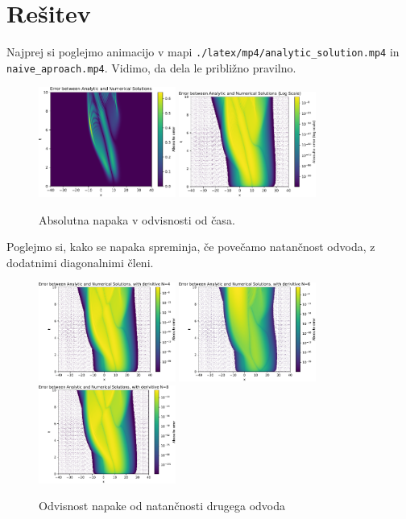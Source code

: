 \section{Rešitev}

Najprej si poglejmo animacijo v mapi \verb|./latex/mp4/analytic_solution.mp4| in \verb|naive_aproach.mp4|.
Vidimo, da dela le približno pravilno.

\begin{figure}[h]
    \centering
    \includegraphics[width=0.4\textwidth]{pdf/abs_error.pdf}
    \includegraphics[width=0.4\textwidth]{pdf/abs_error_log.pdf}
    \caption{Absolutna napaka v odvisnosti od časa.}
\end{figure}
Poglejmo si, kako se napaka spreminja, če povečamo natančnost odvoda, z dodatnimi diagonalnimi členi.
\begin{figure}[h]
    \centering
    \includegraphics[width=0.4\textwidth]{pdf/abs_error_log_4.pdf}
    \includegraphics[width=0.4\textwidth]{pdf/abs_error_log_6.pdf}
    \includegraphics[width=0.4\textwidth]{pdf/abs_error_log_8.pdf}
    \caption{Odvisnost napake od natančnosti drugega odvoda}
\end{figure}

